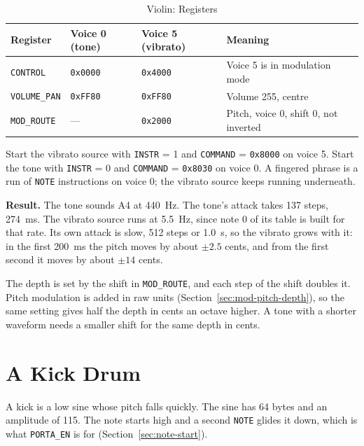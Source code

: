 \begin{table}[H]
	\centering
	\begin{tabular}{llll}
		\toprule
		\textbf{Register}    & \textbf{Voice 0 (tone)} & \textbf{Voice 5 (vibrato)} & \textbf{Meaning}                      \\
		\midrule
		\texttt{CONTROL}     & \texttt{0x0000}         & \texttt{0x4000}            & Voice 5 is in modulation mode         \\
		\texttt{VOLUME\_PAN} & \texttt{0xFF80}         & \texttt{0xFF80}            & Volume 255, centre                    \\
		\texttt{MOD\_ROUTE}  & ---                     & \texttt{0x2000}            & Pitch, voice 0, shift 0, not inverted \\
		\bottomrule
	\end{tabular}
	\caption{Violin: Registers}
	\label{tab:ex-violin-regs}
\end{table}

Start the vibrato source with \texttt{INSTR} = 1 and \texttt{COMMAND} = \texttt{0x8000} on voice 5. Start the tone with
\texttt{INSTR} = 0 and \texttt{COMMAND} = \texttt{0x8030} on voice 0. A fingered phrase is a run of \texttt{NOTE}
instructions on voice 0; the vibrato source keeps running underneath.

\textbf{Result.} The tone sounds A4 at 440~Hz. The tone's attack takes 137 steps, 274~ms. The vibrato source runs at
5.5~Hz, since note 0 of its table is built for that rate. Its own attack is slow, 512 steps or 1.0~s, so the vibrato
grows with it: in the first 200~ms the pitch moves by about $\pm 2.5$ cents, and from the first second it moves by
about $\pm 14$ cents.

The depth is set by the shift in \texttt{MOD\_ROUTE}, and each step of the shift doubles it. Pitch modulation is added
in raw units (Section~\ref{sec:mod-pitch-depth}), so the same setting gives half the depth in cents an octave higher. A
tone with a shorter waveform needs a smaller shift for the same depth in cents.

\section{A Kick Drum}

A kick is a low sine whose pitch falls quickly. The sine has 64 bytes and an amplitude of 115. The note starts high and
a second \texttt{NOTE} glides it down, which is what \texttt{PORTA\_EN} is for (Section~\ref{sec:note-start}).

